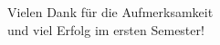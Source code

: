 \begin{frame}
    \begin{center}
    \huge
    Vielen Dank für die Aufmerksamkeit\\\medskip
    und viel Erfolg im ersten Semester!
    \end{center}
\end{frame}